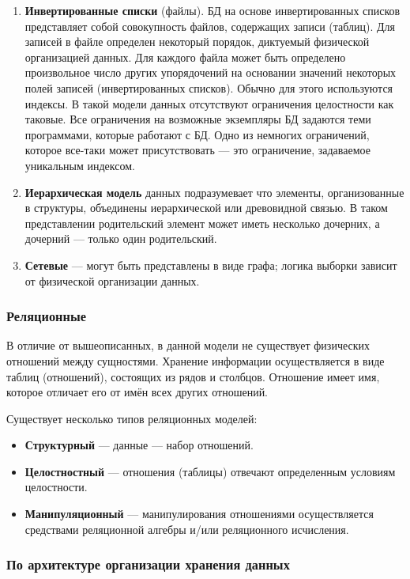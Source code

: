 \begin{enumerate}[label=\arabic*.]
	\item \textbf{Инвертированные списки} (файлы). БД на основе инвертированных списков представляет собой совокупность файлов, содержащих записи (таблиц). Для записей в файле определен некоторый порядок, диктуемый физической организацией данных. Для каждого файла может быть определено произвольное число других упорядочений на основании значений некоторых полей записей (инвертированных списков). Обычно для этого используются индексы. В такой модели данных отсутствуют ограничения целостности как таковые. Все ограничения на возможные экземпляры БД задаются теми программами, которые работают с БД. Одно из немногих ограничений, которое все-таки может присутствовать --- это ограничение, задаваемое уникальным индексом. 
	\item \textbf{Иерархическая модель} данных подразумевает что элементы, организованные в структуры, объединены иерархической или древовидной связью. В таком представлении родительский элемент может иметь несколько дочерних,
	а дочерний --- только один родительский.
	\item \textbf{Сетевые} --- могут быть представлены в виде графа; логика выборки зависит от физической организации данных.
\end{enumerate}

\subsubsection{Реляционные}

В отличие от вышеописанных, в данной модели не существует 
физических отношений между сущностями. 
Хранение информации осуществляется
в виде таблиц (отношений), состоящих из рядов и столбцов. 
Отношение имеет
имя, которое отличает его от имён всех других отношений.

Существует несколько типов реляционных моделей:

\begin{itemize}
	\item \textbf{Структурный} --- данные --- набор отношений.
	\item \textbf{Целостностный} --- отношения (таблицы) отвечают определенным условиям целостности.
	\item \textbf{Манипуляционный} --- манипулирования отношениями осуществляется средствами реляционной алгебры и/или реляционного исчисления.
\end{itemize}


\subsubsection{По архитектуре организации хранения данных}

